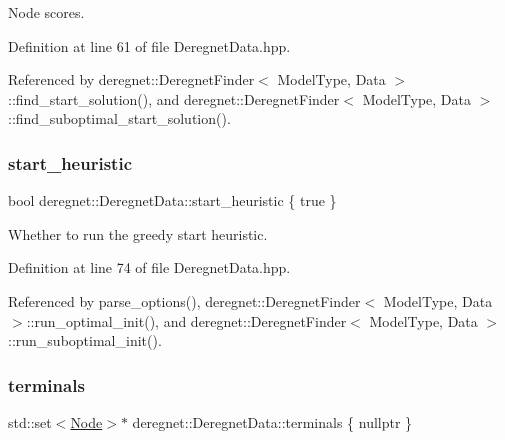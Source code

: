 Node scores. 



Definition at line 61 of file Deregnet\+Data.\+hpp.



Referenced by deregnet\+::\+Deregnet\+Finder$<$ Model\+Type, Data $>$\+::find\+\_\+start\+\_\+solution(), and deregnet\+::\+Deregnet\+Finder$<$ Model\+Type, Data $>$\+::find\+\_\+suboptimal\+\_\+start\+\_\+solution().

\mbox{\label{classderegnet_1_1DeregnetData_abac721360704af5615f7ff84b183eebd}} 
\subsubsection{\texorpdfstring{start\+\_\+heuristic}{start\_heuristic}}
{\footnotesize\ttfamily bool deregnet\+::\+Deregnet\+Data\+::start\+\_\+heuristic \{ true \}}



Whether to run the greedy start heuristic. 



Definition at line 74 of file Deregnet\+Data.\+hpp.



Referenced by parse\+\_\+options(), deregnet\+::\+Deregnet\+Finder$<$ Model\+Type, Data $>$\+::run\+\_\+optimal\+\_\+init(), and deregnet\+::\+Deregnet\+Finder$<$ Model\+Type, Data $>$\+::run\+\_\+suboptimal\+\_\+init().

\mbox{\label{classderegnet_1_1DeregnetData_a1fe559c6056cd411647f836849e4b0da}} 
\subsubsection{\texorpdfstring{terminals}{terminals}}
{\footnotesize\ttfamily std\+::set$<$\hyperlink{namespacederegnet_a744bad34f2de9856d36715a445f027f3}{Node}$>$$\ast$ deregnet\+::\+Deregnet\+Data\+::terminals \{ nullptr \}}



